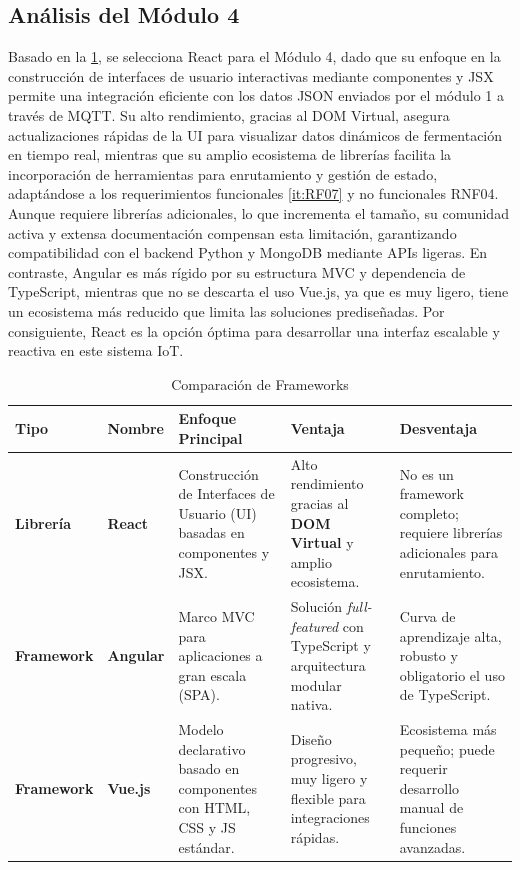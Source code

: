 \subsection{Análisis del Módulo 4}

Basado en la \cref{tab:framework}, se selecciona React para el Módulo 4, 
dado que su enfoque en la construcción de interfaces de usuario interactivas mediante componentes y 
JSX permite una integración eficiente con los datos JSON enviados por el módulo 1 a través de MQTT. Su alto 
rendimiento, gracias al DOM Virtual, asegura actualizaciones rápidas de la UI para visualizar datos dinámicos de 
fermentación en tiempo real, mientras que su amplio ecosistema de librerías facilita la incorporación de herramientas 
para enrutamiento y gestión de estado, adaptándose a los requerimientos funcionales \ref{it:RF07} y no funcionales RNF04. 
Aunque requiere librerías adicionales, lo que incrementa el tamaño, su comunidad activa y extensa documentación compensan 
esta limitación, garantizando compatibilidad con el backend Python y MongoDB mediante APIs ligeras. En contraste, 
Angular es más rígido por su estructura MVC y dependencia de TypeScript, mientras que no se descarta el uso Vue.js, 
ya que es muy ligero, 
tiene un ecosistema más reducido que limita las soluciones prediseñadas. Por consiguiente, React es la opción 
óptima para desarrollar una interfaz escalable y reactiva en este sistema IoT.

\begin{table}[htbp] %
    \centering
    \caption{Comparación de Frameworks}
    \label{tab:framework}
    \begingroup
    \setlength{\tabcolsep}{3pt} 
    \renewcommand{\arraystretch}{1.5} 
    \small 
    \begin{tabularx}{\textwidth}{|l|l|X|X|X|}
    \hline
    \textbf{Tipo} & \textbf{Nombre} & \textbf{Enfoque Principal} & \textbf{Ventaja} & \textbf{Desventaja} \\ \hline
    
    \textbf{Librería} & \textbf{React} \cite{zotero-item-134} & Construcción de Interfaces de Usuario (UI) basadas en componentes y JSX. & Alto rendimiento gracias al \textbf{DOM Virtual} y amplio ecosistema. & No es un framework completo; requiere librerías adicionales para enrutamiento. \\ \hline
    
    \textbf{Framework} & \textbf{Angular} \cite{zotero-item-136} & Marco MVC para aplicaciones a gran escala (SPA). & Solución \textit{full-featured} con TypeScript y arquitectura modular nativa. & Curva de aprendizaje alta, robusto y obligatorio el uso de TypeScript. \\ \hline
    
    \textbf{Framework} & \textbf{Vue.js} \cite{zotero-item-138} & Modelo declarativo basado en componentes con HTML, CSS y JS estándar. & Diseño progresivo, muy ligero y flexible para integraciones rápidas. & Ecosistema más pequeño; puede requerir desarrollo manual de funciones avanzadas. \\ \hline
    \end{tabularx}
    \endgroup
\end{table}

